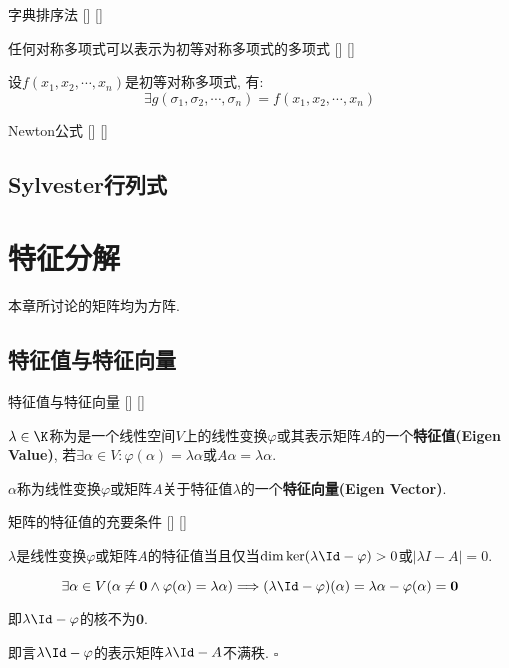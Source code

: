\documentclass[UTF8]{ctexart}
\begin{document}
		\begin{dfn}
			[]
			{字典排序法}
			[]
			[]

		\end{dfn}
		
		\begin{thm}
			[]
			{任何对称多项式可以表示为初等对称多项式的多项式}
			[]
			[]

			设$f(x_1,x_2,\cdots,x_n)$是初等对称多项式, 有: 
			\[\exists g(\sigma_1,\sigma_2,\cdots,\sigma_n)=f(x_1,x_2,\cdots,x_n)\]
		\end{thm}
		
		\begin{thm}
			[]
			{Newton公式}
			[]
			[]

		\end{thm}
	
	\subsection{Sylvester行列式}
	
\section{特征分解}

	本章所讨论的矩阵均为方阵. 

	\subsection{特征值与特征向量}
		
		\begin{dfn}
			[]
			{特征值与特征向量}
			[]
			[]

			$\lambda\in\K$称为是一个线性空间$V$上的线性变换$\varphi$或其表示矩阵$A$的一个\textbf{特征值(Eigen Value)}, 若$\exists \alpha\in V: \varphi(\alpha)=\lambda\alpha$或$A\alpha=\lambda\alpha$. 
			
			$\alpha$称为线性变换$\varphi$或矩阵$A$关于特征值$\lambda$的一个\textbf{特征向量(Eigen Vector)}. 
		\end{dfn}
		
		\begin{ppt}
			[]
			{矩阵的特征值的充要条件}
			[]
			[]

			$\lambda$是线性变换$\varphi$或矩阵$A$的特征值当且仅当$\dim\ker(\lambda \Id-\varphi)>0$或$|\lambda I-A|=0$. 
		\end{ppt}
		
		\begin{prf}
			\[\exists\alpha\in V(\alpha\neq\mathbf{0}\wedge\varphi(\alpha)=\lambda\alpha)\Longrightarrow (\lambda\Id-\varphi)(\alpha)=\lambda\alpha-\varphi(\alpha)=\mathbf{0}\]

			即$\lambda\Id-\varphi$的核不为$\mathbf{0}$. 

			即言$\lambda\Id-\varphi$的表示矩阵$\lambda\Id-A$不满秩. $\square$
            \end{prf}
\end{document}
